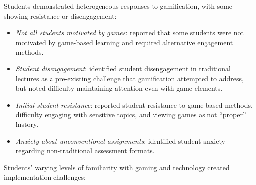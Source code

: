 \documentclass[a4paper,fleqn]{cas-sc}
\begin{document}

Students demonstrated heterogeneous responses to gamification, with some showing resistance or disengagement:

\begin{itemize}[noitemsep]
 \item \textit{Not all students motivated by games}: \citet{6Czerwinski2018} reported that some students were not motivated by game-based learning and required alternative engagement methods.
 
 \item \textit{Student disengagement}: \citet{21Ghulamani2017} identified student disengagement in traditional lectures as a pre-existing challenge that gamification attempted to address, but noted difficulty maintaining attention even with game elements.
 
 \item \textit{Initial student resistance}: \citet{42Huffer201581, 65Razak201139, 78Rouse2022357} reported student resistance to game-based methods, difficulty engaging with sensitive topics, and viewing games as not ``proper'' history.
 
 
 \item \textit{Anxiety about unconventional assignments}: \citet{60Hoy2018} identified student anxiety regarding non-traditional assessment formats.
\end{itemize}


Students' varying levels of familiarity with gaming and technology created implementation challenges:
\end{document}

